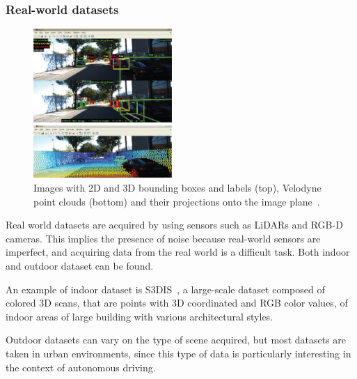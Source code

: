 \subsubsection{Real-world datasets}


\begin{figure}
    \includegraphics[width=0.47\textwidth]{images/kitti.jpeg} 
    \caption{Images with 2D and 3D bounding boxes and labels (top), Velodyne point clouds (bottom) and their projections onto the image plane~\cite{kitti}.}
    \label{fig:kitti}
\end{figure}

Real world datasets are acquired by using sensors such as LiDARs and RGB-D cameras. This implies the presence of noise because real-world sensors are imperfect, and acquiring data from the real world is a difficult task. Both indoor and outdoor dataset can be found.

An example of indoor dataset is S3DIS~\cite{s3dis}, a large-scale dataset composed of colored 3D scans, that are points with 3D coordinated and RGB color values, of indoor areas of large building with various architectural styles.

Outdoor datasets can vary on the type of scene acquired, but most datasets are taken in urban environments, since this type of data is particularly interesting in the context of autonomous driving.


